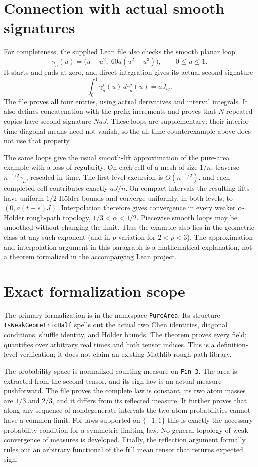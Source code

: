 \documentclass[11pt]{article}
\begin{document}
\section*{Connection with actual smooth signatures}
For completeness, the supplied Lean file also checks the smooth planar loop
\[
\gamma_a(u)=\bigl(u-u^2,\;60a(u^2-u^3)\bigr),\qquad 0\leq u\leq1.
\]
It starts and ends at zero, and direct integration gives its actual second
signature
\[
\int_0^1 \gamma_a^i(u)\,d\gamma_a^j(u)=aJ_{ij}.
\]
The file proves all four entries, using actual derivatives and interval
integrals. It also defines concatenation with the prefix increments and
proves that $N$ repeated copies have second signature $NaJ$.
These loops are supplementary: their interior-time diagonal means need not
vanish, so the all-time counterexample above does not use that property.

The same loops give the usual smooth-lift approximation of the pure-area
example with a loss of regularity. On each cell of a mesh of size $1/n$,
traverse $n^{-1/2}\gamma_a$, rescaled in time. The first-level excursion is
$O(n^{-1/2})$, and each completed cell contributes exactly $aJ/n$.
On compact intervals the resulting lifts have uniform $1/2$-H\"older bounds
and converge uniformly, in both levels, to $(0,a(t-s)J)$.
Interpolation therefore gives convergence in every weaker
$\alpha$-H\"older rough-path topology, $1/3<\alpha<1/2$.
Piecewise smooth loops may be smoothed without changing the limit.
Thus the example also lies in the geometric class at any such exponent
(and in $p$-variation for $2<p<3$). The approximation and interpolation
argument in this paragraph is a mathematical explanation, not a theorem
formalized in the accompanying Lean project.

\section*{Exact formalization scope}
The primary formalization is in the namespace \texttt{PureArea}.
Its structure \texttt{IsWeakGeometricHalf} spells out the actual two Chen
identities, diagonal conditions, shuffle identity, and H\"older bounds.
The theorem  proves every field;
 quantifies over arbitrary real
times and both tensor indices. This is a definition-level verification;
it does not claim an existing Mathlib rough-path library.

The probability space is normalized counting measure on \texttt{Fin 3}.
The area is extracted from the second tensor, and its sign law is an actual
measure pushforward. The file proves the complete law is constant, its two
atom masses are $1/3$ and $2/3$, and it differs from its reflected measure.
It further proves that along any sequence of nondegenerate intervals the two
atom probabilities cannot have a common limit. For laws supported on
$\{-1,1\}$ this is exactly the necessary probability condition for a
symmetric limiting law. No general topology of weak convergence of measures
is developed. Finally, the reflection argument formally rules out an
arbitrary functional of the full mean tensor that returns expected sign.
\end{document}
